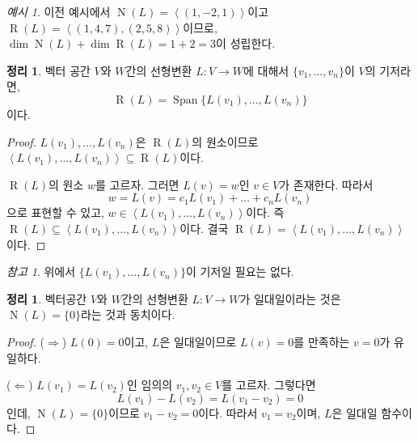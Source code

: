 \documentclass[unfonts,oneside,a4paper]{oblivoir}
\theoremstyle{definition}
\theoremstyle{theorem}
\newtheorem{theorem}[definition]{정리}
\theoremstyle{theorem}
\theoremstyle{remark}
\newtheorem*{remark}{참고}
\theoremstyle{remark}
\theoremstyle{remark}
\newtheorem*{example}{예시}
\theoremstyle{remark}
\renewcommand{\vec}[1]{\bm{\mathit{#1}}}
\newcommand{\vecz}{\bm{\mathrm{0}}}
\DeclareMathOperator{\Span}{Span}
\DeclareMathOperator{\Null}{N}
\DeclareMathOperator{\Range}{R}
\begin{document}
\begin{example}
    이전 예시에서 $\Null (L) = \left<(1, -2, 1)\right>$이고 $\Range (L) = \left<(1, 4, 7), (2, 5, 8)\right>$이므로, $\dim \Null (L) + \dim \Range (L) = 1 + 2 = 3$이 성립한다.
\end{example}

\begin{theorem}
    벡터 공간 $V$와 $W$간의 선형변환 $L: V \rightarrow W$에 대해서 $\{\vec v_1, \dots, \vec v_n\}$이 $V$의 기저라면,
    \begin{equation*}
        \Range (L) = \Span \{L(\vec v_1), \dots, L(\vec v_n)\}
    \end{equation*}
    이다.
\end{theorem}

\begin{proof}
    $L(\vec v_1), \dots, L(\vec v_n)$은 $\Range(L)$의 원소이므로 $\left< L(\vec v_1), \dots, L(\vec v_n) \right> \subseteq \Range(L)$이다.

    $\Range(L)$의 원소 $\vec w$를 고르자.
    그러면 $L(\vec v) = \vec w$인 $\vec v \in V$가 존재한다.
    따라서
    \begin{equation*}
        \vec w = L(\vec v) = c_1 L(\vec v_1) + \dots + c_n L(\vec v_n)
    \end{equation*}
    으로 표현할 수 있고, $\vec w \in \left<L(\vec v_1), \dots, L(\vec v_n)\right>$이다.
    즉 $\Range(L) \subseteq \left<L(\vec v_1), \dots, L(\vec v_n)\right>$이다.
    결국 $\Range(L) = \left<L(\vec v_1), \dots, L(\vec v_n)\right>$이다.
\end{proof}

\begin{remark}
    위에서 $\{L(\vec v_1), \dots, L(\vec v_n)\}$이 기저일 필요는 없다.
\end{remark}

\begin{theorem}\label{thm:one_to_one_nullspace}
    벡터공간 $V$와 $W$간의 선형변환 $L: V \rightarrow W$가 일대일이라는 것은 $\Null (L) = \{\vecz\}$라는 것과 동치이다.
\end{theorem}

\begin{proof}
    ($\Rightarrow$) $L(\vecz) = \vecz$이고, $L$은 일대일이므로 $L(\vec v) = \vecz$를 만족하는 $\vec v = \vecz$가 유일하다.

    ($\Leftarrow$) $L(\vec v_1) = L(\vec v_2)$인 임의의 $\vec v_1, \vec v_2 \in V$를 고르자.
    그렇다면
    \begin{equation*}
        L(\vec v_1) - L(\vec v_2) = L(\vec v_1 - \vec v_2) = \vecz
    \end{equation*}
    인데, $\Null (L) = \{\vecz\}$이므로 $\vec v_1 - \vec v_2 = \vecz$이다.
    따라서 $\vec v_1 = \vec v_2$이며, $L$은 일대일 함수이다.
\end{proof}
\end{document}
